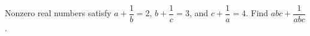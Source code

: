 Nonzero real numbers satisfy $a+\dfrac{1}{b}=2$, $b+\dfrac{1}{c}=3$, and $c+\dfrac{1}{a}=4$. Find $abc+\dfrac{1}{abc}$.
